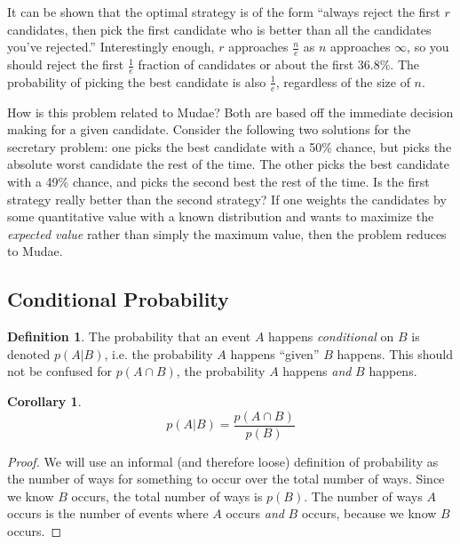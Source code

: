 \documentclass[11pt, oneside]{article}
\theoremstyle{plain}
\newtheorem{corollary}{Corollary}[theorem]
\theoremstyle{definition}
\newtheorem{definition}{Definition}[section]
\begin{document}
It can be shown that the optimal strategy is of the form \enquote{always
reject the first \( r \) candidates, then pick the first candidate who is
better than all the candidates you've rejected.} Interestingly enough, \( r
\) approaches \( \frac{n}{e} \) as \( n \) approaches \( \infty \), so you
should reject the first \( \frac{1}{e} \) fraction of candidates or about
the first \( 36.8\% \). The probability of picking the best candidate is
also \( \frac{1}{e} \), regardless of the size of \( n \).

How is this problem related to Mudae? Both are based off the immediate decision
making for a given candidate. Consider the following two solutions for the
secretary problem: one picks the best candidate with a 50\% chance, but picks
the absolute worst candidate the rest of the time. The other picks the best
candidate with a 49\% chance, and picks the second best the rest of the time.
Is the first strategy really better than the second strategy? If one weights
the candidates by some quantitative value with a known distribution and wants
to maximize the \textit{expected value} rather than simply the maximum value,
then the problem reduces to Mudae.

\newpage

\subsection{Conditional Probability} \label{subsec:conditional}
\begin{definition}
  The probability that an event \( A \) happens \textit{conditional} on \( B \)
  is denoted \( p(A|B) \), i.e. the probability \( A \) happens \enquote{given}
  \( B \) happens. This should not be confused for \( p(A \cap B) \),
  the probability \( A \) happens \textit{and} \( B \) happens.
\end{definition}

\begin{corollary}
  \[ p(A|B) = \frac{p(A \cap B)}{p(B)} \]
\end{corollary}
\begin{proof}
  We will use an informal (and therefore loose) definition of probability as
  the number of ways for something to occur over the total number of ways.
  Since we know \( B \) occurs, the total number of ways is \( p(B) \).
  The number of ways \( A \) occurs is the number of events where \( A \)
  occurs \textit{and} \( B \) occurs, because we know \( B \) occurs.
\end{proof}
\end{document}
